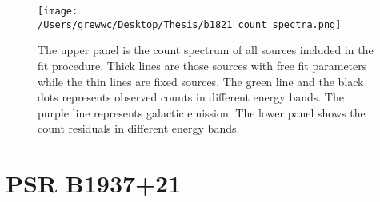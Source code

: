 \documentclass[12pt]{report}
\newcommand{\mycaption}[1]{\protect \caption{#1}}
\begin{document}
      
      
          \begin{figure}[!ht]
            \centering
            \texttt{[image: /Users/grewwc/Desktop/Thesis/b1821\_count\_spectra.png]}
            \caption{The upper panel is the count spectrum of all sources included in the 
                    fit procedure. Thick lines are those sources with free fit parameters 
                    while the thin lines are fixed sources. The green line and the black 
                    dots represents observed counts in different energy bands. The purple 
                    line represents galactic emission. The lower panel shows the count 
                    residuals in different energy bands. } 
            \label{fig: j0218_count_spectra}
          \end{figure}

        \section{PSR B1937+21}
\end{document}
